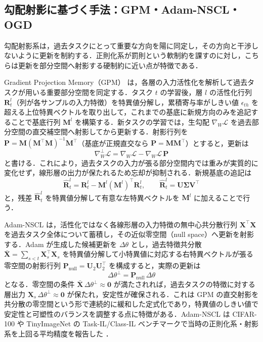 \subsection{勾配射影に基づく手法：GPM・Adam-NSCL・OGD}

勾配射影系は，過去タスクにとって重要な方向を陽に同定し，その方向と干渉しないように更新を制約する．正則化系が罰則という軟制約を課すのに対し，こちらは更新を部分空間へ射影する硬制約に近い点が特徴である．

Gradient Projection Memory（GPM）\cite{gpm} は，各層の入力活性化を解析して過去タスクが用いる重要部分空間を同定する．タスク $t$ の学習後，層 $l$ の活性化行列 $\mathbf{R}^l_t$（列が各サンプルの入力特徴）を特異値分解し，累積寄与率がしきい値 $\epsilon_{th}$ を超える上位特異ベクトルを取り出して，これまでの基底に新規方向のみを追記することで基底行列 $\mathbf{M}^l$ を構築する．新タスクの学習では，生勾配 $\nabla_W \mathcal{L}$ を過去部分空間の直交補空間へ射影してから更新する．射影行列を $\mathbf{P}=\mathbf{M}(\mathbf{M}^{\top}\mathbf{M})^{-1}\mathbf{M}^{\top}$（基底が正規直交なら $\mathbf{P}=\mathbf{M}\mathbf{M}^{\top}$）とすると，更新は
\begin{equation}
\nabla_W^{\perp}\mathcal{L}=\nabla_W \mathcal{L}-\nabla_W \mathcal{L}\,\mathbf{P}
\end{equation}
と書ける．これにより，過去タスクの入力が張る部分空間内では重みが実質的に変化せず，線形層の出力が保たれるため忘却が抑制される．新規基底の追記は
\begin{equation}
\hat{\mathbf{R}}^l_t=\mathbf{R}^l_t-\mathbf{M}^l(\mathbf{M}^l)^{\top}\mathbf{R}^l_t,\qquad \hat{\mathbf{R}}^l_t=\mathbf{U}\boldsymbol{\Sigma}\mathbf{V}^{\top}
\end{equation}
と，残差 $\hat{\mathbf{R}}^l_t$ を特異値分解して有意な左特異ベクトルを $\mathbf{M}^l$ に加えることで行う．

Adam-NSCL \cite{adamnscl} は，活性化ではなく各線形層の入力特徴の無中心共分散行列 $\mathbf{X}^{\top}\mathbf{X}$ を過去タスク全体について蓄積し，その近似零空間（null space）へ更新を射影する．Adam が生成した候補更新を $\Delta\theta$ とし，過去特徴共分散 $\bar{\mathbf{X}}=\sum_{s<t}\mathbf{X}_s^{\top}\mathbf{X}_s$ を特異値分解して小特異値に対応する右特異ベクトルが張る零空間の射影行列 $\mathbf{P}_{\mathrm{null}}=\mathbf{U}_2\mathbf{U}_2^{\top}$ を構成すると，実際の更新は
\begin{equation}
\Delta\theta^{\perp}=\mathbf{P}_{\mathrm{null}}\,\Delta\theta
\end{equation}
となる．零空間の条件 $\bar{\mathbf{X}}\,\Delta\theta^{\perp}\approx \mathbf{0}$ が満たされれば，過去タスクの特徴に対する層出力 $\mathbf{X}_s\,\Delta\theta^{\perp}\approx\mathbf{0}$ が保たれ，安定性が確保される．これは GPM の直交射影を共分散の零空間という形で連続的に緩和した定式化であり，特異値のしきい値で安定性と可塑性のバランスを調整する点に特徴がある．Adam-NSCL は CIFAR-100 や TinyImageNet の Task-IL/Class-IL ベンチマークで当時の正則化系・射影系を上回る平均精度を報告した \cite{adamnscl}．

